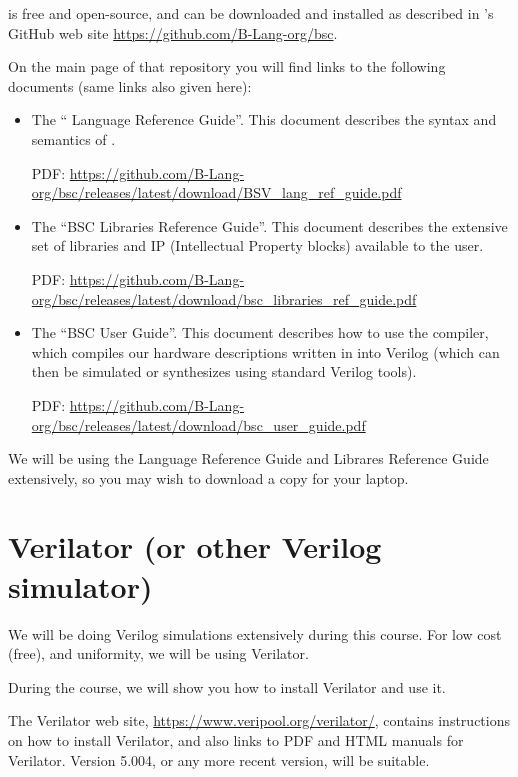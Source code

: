 {\bsc} is free and open-source, and can be downloaded and installed as
described in {\BSV}'s GitHub web site
\url{https://github.com/B-Lang-org/bsc}.

On the main page of that repository you will find links to the
following documents (same links also given here):

\begin{itemize}

  \item The ``{\BSV} Language Reference Guide''.  This document
  describes the syntax and semantics of {\BSV}.

  PDF: \url{https://github.com/B-Lang-org/bsc/releases/latest/download/BSV_lang_ref_guide.pdf}

  \item The ``BSC Libraries Reference Guide''.  This document
  describes the extensive set of libraries and IP (Intellectual
  Property blocks) available to the {\BSV} user.

  PDF: \url{https://github.com/B-Lang-org/bsc/releases/latest/download/bsc_libraries_ref_guide.pdf}

  \item The ``BSC User Guide''.  This document describes how to use
  the {\bsc} compiler, which compiles our hardware descriptions
  written in {\BSV} into Verilog (which can then be simulated or
  synthesizes using standard Verilog tools).

  PDF: \url{https://github.com/B-Lang-org/bsc/releases/latest/download/bsc_user_guide.pdf}

\end{itemize}

We will be using the Language Reference Guide and Librares Reference
Guide extensively, so you may wish to download a copy for your laptop.


\section{Verilator (or other Verilog simulator)}

We will be doing Verilog simulations extensively during this course.
For low cost (free), and uniformity, we will be using Verilator.

During the course, we will show you how to install Verilator and use it.

The Verilator web site, \url{https://www.veripool.org/verilator/},
contains instructions on how to install Verilator, and also links to
PDF and HTML manuals for Verilator.  Version 5.004, or any more recent
version, will be suitable.

